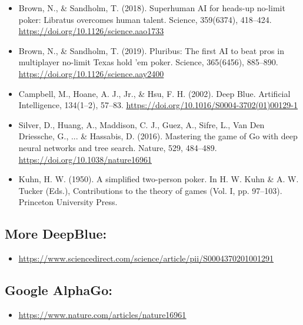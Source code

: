 \documentclass[
]{article}
\begin{document}
\begin{itemize}
\item
  Brown, N., \& Sandholm, T. (2018). Superhuman AI for heads-up no-limit
  poker: Libratus overcomes human talent. Science, 359(6374), 418--424.
  \href{https://doi.org/10.1126/science.aao1733}{\ul{https://doi.org/10.1126/science.aao1733}}
\item
  Brown, N., \& Sandholm, T. (2019). Pluribus: The first AI to beat pros
  in multiplayer no-limit Texas hold 'em poker. Science, 365(6456),
  885--890.
  \href{https://doi.org/10.1126/science.aay2400}{\ul{https://doi.org/10.1126/science.aay2400}}
\item
  Campbell, M., Hoane, A. J., Jr., \& Hsu, F. H. (2002). Deep Blue.
  Artificial Intelligence, 134(1--2), 57--83.
  \href{https://doi.org/10.1016/S0004-3702(01)00129-1}{\ul{https://doi.org/10.1016/S0004-3702(01)00129-1}}
\item
  Silver, D., Huang, A., Maddison, C. J., Guez, A., Sifre, L., Van Den
  Driessche, G., ... \& Hassabis, D. (2016). Mastering the game of Go
  with deep neural networks and tree search. Nature, 529, 484--489.
  \href{https://doi.org/10.1038/nature16961}{\ul{https://doi.org/10.1038/nature16961}}
\item
  Kuhn, H. W. (1950). A simplified two-person poker. In H. W. Kuhn \& A.
  W. Tucker (Eds.), Contributions to the theory of games (Vol. I, pp.
  97--103). Princeton University Press.
\end{itemize}

\subsection{More DeepBlue:}\label{more-deepblue}

\begin{itemize}
\item
  \href{https://www.sciencedirect.com/science/article/pii/S0004370201001291}{\ul{https://www.sciencedirect.com/science/article/pii/S0004370201001291}}
\end{itemize}

\subsection{\texorpdfstring{Google AlphaGo:
}{Google AlphaGo: }}\label{google-alphago}

\begin{itemize}
\item
  \href{https://www.nature.com/articles/nature16961}{\ul{https://www.nature.com/articles/nature16961}}
\end{itemize}
\end{document}
